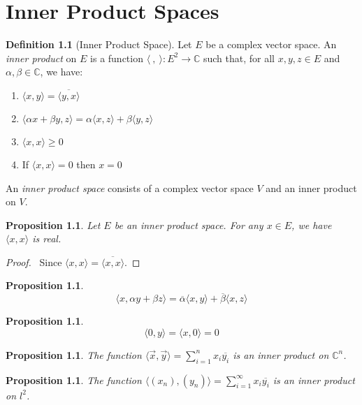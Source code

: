 \documentclass{book}
\let\qed\relax
\newtheorem{prop}[ax]{Proposition}
\theoremstyle{definition}
\newtheorem{df}[ax]{Definition}
\begin{document}
\chapter{Inner Product Spaces}

\begin{df}[Inner Product Space]
Let $E$ be a complex vector space. An \emph{inner product} on $E$ is a function $\langle \ , \ \rangle : E^2 \rightarrow \mathbb{C}$ such that, for all $x,y,z \in E$ and $\alpha, \beta \in \mathbb{C}$, we have:
\begin{enumerate}
\item $\langle x,y \rangle = \overline{\langle y,x \rangle}$
\item $\langle \alpha x + \beta y, z \rangle = \alpha \langle x,z \rangle + \beta \langle y,z \rangle$
\item $\langle x,x \rangle \geq 0$
\item If $\langle x,x \rangle = 0$ then $x = 0$
\end{enumerate}
An \emph{inner product space} consists of a complex vector space $V$ and an inner product on $V$.
\end{df}

\begin{prop}
Let $E$ be an inner product space. For any $x \in E$, we have $\langle x,x \rangle$ is real.
\end{prop}

\begin{proof}
\pf\ Since $\langle x,x \rangle = \overline{\langle x,x \rangle}$. \qed
\end{proof}

\begin{prop}
\[ \langle x, \alpha y + \beta z \rangle = \overline{\alpha} \langle x,y \rangle + \overline{\beta} \langle x,z \rangle \]
\end{prop}

\begin{prop}
\[ \langle 0,y \rangle = \langle x,0 \rangle = 0 \]
\end{prop}

\begin{prop}
The function $\langle \vec{x}, \vec{y} \rangle = \sum_{i=1}^n x_i \overline{y_i}$ is an inner product on $\mathbb{C}^n$.
\end{prop}

\begin{prop}
The function $\langle (x_n), (y_n) \rangle = \sum_{i=1}^\infty x_i \overline{y_i}$ is an inner product on $l^2$.
\end{prop}
\end{document}
